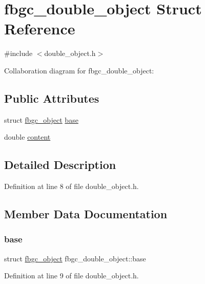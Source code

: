\hypertarget{structfbgc__double__object}{}\section{fbgc\+\_\+double\+\_\+object Struct Reference}
\label{structfbgc__double__object}


{\ttfamily \#include $<$double\+\_\+object.\+h$>$}



Collaboration diagram for fbgc\+\_\+double\+\_\+object\+:
\subsection*{Public Attributes}
\begin{DoxyCompactItemize}
\item 
struct \hyperlink{structfbgc__object}{fbgc\+\_\+object} \hyperlink{structfbgc__double__object_ab0368325cf2b0d052498cbbdf9f671fd}{base}
\item 
double \hyperlink{structfbgc__double__object_a839dc9f0b67fc0e959e909111fd7d35c}{content}
\end{DoxyCompactItemize}


\subsection{Detailed Description}


Definition at line 8 of file double\+\_\+object.\+h.



\subsection{Member Data Documentation}
\mbox{\label{structfbgc__double__object_ab0368325cf2b0d052498cbbdf9f671fd}} 
\subsubsection{\texorpdfstring{base}{base}}
{\footnotesize\ttfamily struct \hyperlink{structfbgc__object}{fbgc\+\_\+object} fbgc\+\_\+double\+\_\+object\+::base}



Definition at line 9 of file double\+\_\+object.\+h.

